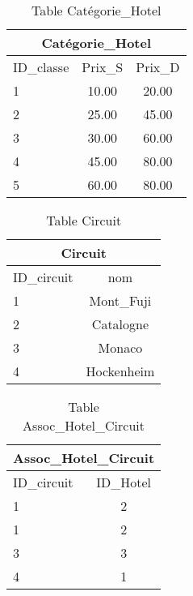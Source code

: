 \documentclass[10pt]{article}
\begin{document}

\begin{table}[h]
\begin{center}
\begin{tabular}{|l|c|c|}
\hline
\multicolumn{3}{|c|}{Catégorie\_Hotel}\\
\hline
ID\_classe& Prix\_S & Prix\_D \\
\hline
1 & 10.00& 20.00\\
\hline
2 & 25.00& 45.00\\
\hline
3 & 30.00& 60.00\\
\hline
4 &  45.00& 80.00\\
\hline
5 & 60.00& 80.00\\
\hline
\end{tabular}
\end{center}
\caption{Table Catégorie\_Hotel}
\end{table}


\begin{table}[h]
\begin{center}
\begin{tabular}{|l|c|}
\hline
\multicolumn{2}{|c|}{Circuit}\\
\hline
ID\_circuit& nom \\
\hline
1 & Mont\_Fuji\\
\hline
2 & Catalogne\\
\hline
3 & Monaco\\
\hline
4 &  Hockenheim\\
\hline
\end{tabular}
\end{center}
\caption{Table Circuit}
\end{table}


\begin{table}[h]
\begin{center}
\begin{tabular}{|l|c|}
\hline
\multicolumn{2}{|c|}{Assoc\_Hotel\_Circuit}\\
\hline
ID\_circuit& ID\_Hotel \\
\hline
1 & 2\\
\hline
1 & 2\\
\hline
3 & 3\\
\hline
4 & 1 \\
\hline
\end{tabular}
\end{center}
\caption{Table Assoc\_Hotel\_Circuit}
\end{table}
\newpage
\end{document}
